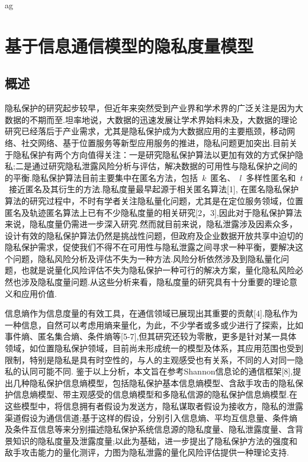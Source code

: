 ag\chapter{基于信息通信模型的隐私度量模型}
\label{chap:entropy-metric-model}

\section{概述}

隐私保护的研究起步较早，但近年来突然受到产业界和学术界的广泛关注是因为大数据的不期而至.坦率地说，大数据的迅速发展让学术界始料未及，大数据的理论研究已经落后于产业需求，尤其是隐私保护成为大数据应用的主要瓶颈，移动网络、社交网络、基于位置服务等新型应用服务的推进，隐私问题更加突出.目前关于隐私保护有两个方向值得关注：一是研究隐私保护算法以更加有效的方式保护隐私;二是通过研究隐私泄露风险分析与评估，解决数据的可用性与隐私保护之间的的平衡.隐私保护算法目前主要集中在匿名方法，包括~$k$~匿名、~$l$~多样性匿名和~$t$~接近匿名及其衍生的方法.隐私度量最早起源于相关匿名算法[1], 在匿名隐私保护算法的研究过程中，不时有学者关注隐私量化问题，尤其是在定位服务领域，位置匿名及轨迹匿名算法上已有不少隐私度量的相关研究[2，3],因此对于隐私保护算法来说，隐私度量仍需进一步深入研究.然而就目前来说，隐私泄露涉及因素众多，设计有效的隐私保护算法仍然是挑战性问题，但政府及企业数据开放共享中迫切的隐私保护需求，促使我们不得不在可用性与隐私泄露之间寻求一种平衡，要解决这个问题，隐私风险分析及评估不失为一种方法.风险分析依然涉及到隐私量化问题，也就是说量化风险评估不失为隐私保护一种可行的解决方案，量化隐私风险必然也涉及隐私度量问题.从这些分析来看，隐私度量的研究具有十分重要的理论意义和应用价值.

信息熵作为信息度量的有效工具，在通信领域已展现出其重要的贡献[4].隐私作为一种信息，自然可以考虑用熵来量化，为此，不少学者或多或少进行了探索，比如事件熵、匿名集合熵、条件熵等[5-7],但其研究还较为零散，更多是针对某一具体领域，如位置隐私保护领域，目前尚未形成统一的模型及体系，其应用范围也受到限制，特别是隐私是具有时空性的，与人的主观感受也有关系，不同的人对同一隐私的认同可能不同. 鉴于以上分析，本文旨在参考Shannon信息论的通信框架[8],提出几种隐私保护信息熵模型，包括隐私保护基本信息熵模型、含敌手攻击的隐私保护信息熵模型、带主观感受的信息熵模型和多隐私信源的隐私保护信息熵模型.在这些模型中，将信息拥有者假设为发送方，隐私谋取者假设为接收方，隐私的泄露渠道假设为通信信道;基于这样的假设，分别引入信息熵、平均互信息量、条件熵及条件互信息等来分别描述隐私保护系统信息源的隐私度量、隐私泄露度量、含背景知识的隐私度量及泄露度量;以此为基础，进一步提出了隐私保护方法的强度和敌手攻击能力的量化测评，力图为隐私泄露的量化风险评估提供一种理论支持.


